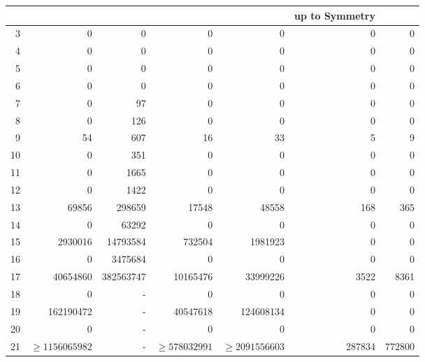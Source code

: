 \documentclass[12pt,reqno]{article}
\begin{document}
\begin{table}[H]
\begin{center}
\begin{tabular}{r|rr|rr|rr}
 &  & & & & up to Symmetry& \\ \hline
 3 &            0 &            0 &            0 &            0 &            0 &            0 \\
 4 &            0 &            0 &            0 &            0 &            0 &            0 \\
 5 &            0 &            0 &            0 &            0 &            0 &            0 \\
 6 &            0 &            0 &            0 &            0 &            0 &            0 \\
 7 &            0 &           97 &            0 &            0 &            0 &            0 \\
 8 &            0 &          126 &            0 &            0 &            0 &            0 \\
 9 &           54 &          607 &           16 &           33 &            5 &            9 \\
10 &            0 &          351 &            0 &            0 &            0 &            0 \\
11 &            0 &         1665 &            0 &            0 &            0 &            0 \\
12 &            0 &         1422 &            0 &            0 &            0 &            0 \\
13 &        69856 &       298659 &        17548 &        48558 &          168 &          365 \\
14 &            0 &        63292 &            0 &            0 &            0 &            0 \\
15 &      2930016 &     14793584 &       732504 &      1981923 &            0 &            0 \\
16 &            0 &      3475684 &            0 &            0 &            0 &            0 \\
17 &     40654860 &    382563747 &     10165476 &     33999226 &         3522 &         8361 \\
18 &  0 & -
   &            0 &            0 &            0 &            0 \\
19 &  162190472
 & - 
 &     40547618 &    124608134 &            0 &            0 \\
20 & 0
 & -
 &            0 &            0 &            0 &            0 \\
21 & $\geq 1156065982$
& -
&$\geq  578032991$ 
 & $\geq 2091556603$
 &       287834 &       772800 \\

\end{tabular}
\end{center}
\end{table}
\end{document}
